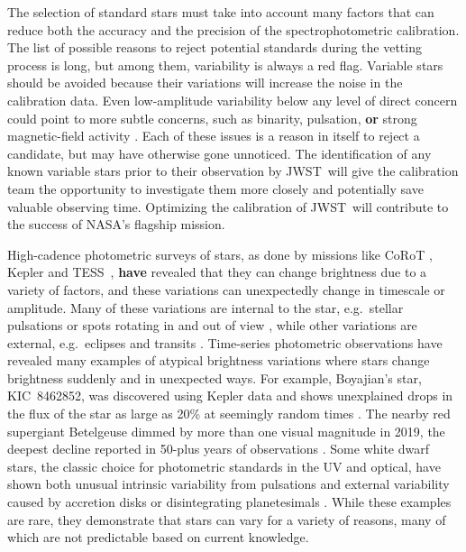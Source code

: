 \documentclass[twocolumn, linenumbers]{aastex631}
\newcommand{\webb}{JWST}
\newcommand{\tess}{TESS}
\begin{document}
The selection of standard stars must take into account many factors that can reduce both the accuracy and the precision of the spectrophotometric calibration.  The list of possible reasons to reject potential standards during the vetting process is long, but among them, variability is always a red flag.  Variable stars should be avoided because their variations will increase the noise in the calibration data.  Even low-amplitude variability below any level of direct concern could point to more subtle concerns, such as binarity, pulsation, \textbf{or} strong magnetic-field activity \citep{Bohlin2014PASP126}.  Each of these issues is a reason in itself to reject a candidate, but may have otherwise gone unnoticed.  The identification of any known variable stars prior to their observation by \webb\ will give the calibration team the opportunity to investigate them more closely and potentially save valuable observing time.  Optimizing the calibration of \webb\ will contribute to the success of NASA's flagship mission.

High-cadence photometric surveys of stars, as done by missions like CoRoT \citep{corot}, Kepler \citep{Koch2010} and \tess\ \citep{Ricker2015}, \textbf{have} revealed that they can change brightness due to a variety of factors, and these variations can unexpectedly change in timescale or amplitude. Many of these variations are internal to the star, e.g.\ stellar pulsations \citep[e.g.][]{Berger1979deltaScuti} or spots rotating in and out of view \textbf{ \citep[e.g.][]{Mcquillan2014, Balona2021} }, while other variations are external, e.g.\ eclipses and transits \citep[e.g.][]{prsa2011, Thompson2018}. Time-series photometric observations have revealed many examples of atypical brightness variations where stars change brightness suddenly and in unexpected ways.  For example, Boyajian's star, KIC~8462852, was discovered using Kepler data and shows unexplained drops in the flux of the star as large as 20\% at seemingly random times \citep{Boyajian2016MNRAS}.  The nearby red supergiant Betelgeuse dimmed by more than one visual magnitude in 2019, the deepest decline reported in 50-plus years of observations \citep{Betelgeuse2021Natur594,Cotton2020RNAAS4}.  Some white dwarf stars, the classic choice for photometric standards in the UV and optical, have shown both unusual intrinsic variability from pulsations \citep[e.g.][]{Provencal2009ApJGD358,Kilic2015ApJ,Hermes2017MNRAS} and external variability caused by accretion disks \citep{Scaringi2021Nat} or disintegrating planetesimals \citep[as large as 40\%;][]{Vanderburg2015Natur,Guidry2021}.  While these examples are rare, they demonstrate that stars can vary for a variety of reasons, many of which are not predictable based on current knowledge.  
\end{document}
